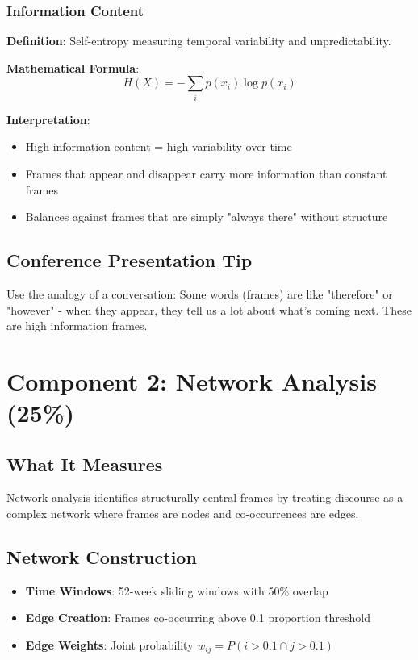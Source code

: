 \documentclass[11pt]{article}
\begin{document}
\subsubsection{Information Content}
\textbf{Definition}: Self-entropy measuring temporal variability and unpredictability.

\textbf{Mathematical Formula}:
$$H(X) = -\sum_{i} p(x_i) \log p(x_i)$$

\textbf{Interpretation}:
\begin{itemize}
    \item High information content = high variability over time
    \item Frames that appear and disappear carry more information than constant frames
    \item Balances against frames that are simply "always there" without structure
\end{itemize}

\subsection{Conference Presentation Tip}
Use the analogy of a conversation: Some words (frames) are like "therefore" or "however" - when they appear, they tell us a lot about what's coming next. These are high information frames.

\section{Component 2: Network Analysis (25\%)}

\subsection{What It Measures}
Network analysis identifies structurally central frames by treating discourse as a complex network where frames are nodes and co-occurrences are edges.

\subsection{Network Construction}
\begin{itemize}
    \item \textbf{Time Windows}: 52-week sliding windows with 50\% overlap
    \item \textbf{Edge Creation}: Frames co-occurring above 0.1 proportion threshold
    \item \textbf{Edge Weights}: Joint probability $w_{ij} = P(i > 0.1 \cap j > 0.1)$
\end{itemize}
\end{document}
